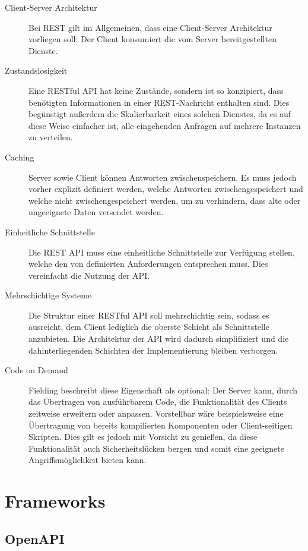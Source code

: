 		\begin{description}
			\item[Client-Server Architektur] 
				Bei \acs{REST} gilt im Allgemeinen, dass eine Client-Server Architektur vorliegen soll: Der Client konsumiert die vom Server bereitgestellten Dienste. 
			\item[Zustandslosigkeit] 
				Eine RESTful \acs{API} hat keine Zustände, sondern ist so konzipiert, dass benötigten Informationen in einer REST-Nachricht enthalten sind. Dies begünstigt außerdem die Skalierbarkeit eines solchen Dienstes, da es auf diese Weise einfacher ist, alle eingehenden Anfragen auf mehrere Instanzen zu verteilen.
			\item[Caching] 
				Server sowie Client können Antworten zwischenspeichern. Es muss jedoch vorher explizit definiert werden, welche Antworten zwischengespeichert und welche nicht zwischengespeichert werden, um zu verhindern, dass alte oder ungeeignete Daten versendet werden.
			\item[Einheitliche Schnittstelle]
				Die \acs{REST} \acs{API} muss eine einheitliche Schnittstelle zur Verfügung stellen, welche den von \cite{RoyThomasFielding.2000} definierten Anforderungen entsprechen muss. Dies vereinfacht die Nutzung der \acs{API}.
			\item[Mehrschichtige Systeme]
				 Die Struktur einer RESTful \acs{API} soll mehrschichtig sein, sodass es ausreicht, dem Client lediglich die oberste Schicht als Schnittstelle anzubieten. Die Architektur der API wird dadurch simplifiziert und die dahinterliegenden Schichten der Implementierung bleiben verborgen.
			\item[Code on Demand] 
				Fielding beschreibt diese Eigenschaft als optional: Der Server kann, durch das Übertragen von ausführbarem Code, die Funktionalität des Clients zeitweise erweitern oder anpassen. Vorstellbar wäre beispielsweise eine Übertragung von bereits kompilierten Komponenten oder Client-seitigen Skripten. Dies gilt es jedoch mit Vorsicht zu genießen, da diese Funktionalität auch Sicherheitslücken bergen und somit eine geeignete Angriffsmöglichkeit bieten kann. 
				
		\end{description}

	\section{Frameworks}
	
		\subsection{OpenAPI} %
		
